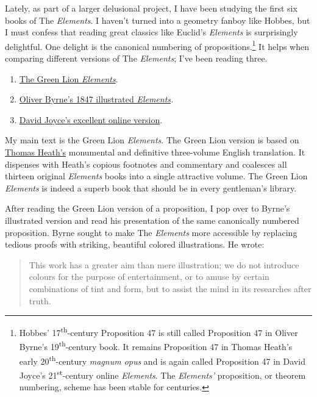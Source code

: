 Lately, as part of a larger delusional project, I have been studying the
first six books of The \emph{Elements}. I haven't turned into a geometry
fanboy like Hobbes, but I must confess that reading great classics like
Euclid's \emph{Elements} is surprisingly delightful. One delight is the
canonical numbering of propositions.\footnote{Hobbes'
  17\textsuperscript{th}-century Proposition 47 is still called
  Proposition 47 in Oliver Byrne's 19\textsuperscript{th}-century book.
  It remains Proposition 47 in Thomas Heath's early
  20\textsuperscript{th}-century \emph{magnum opus} and is again called
  Proposition 47 in David Joyce's 21\textsuperscript{st}-century online
  \emph{Elements}. The \emph{Elements'} proposition, or theorem
  numbering, scheme has been stable for centuries.} It helps when
comparing different versions of The \emph{Elements}; I've been reading
three.

\begin{enumerate}
\def\labelenumi{\arabic{enumi}.}
\tightlist
\item
  \href{https://www.greenlion.com/books/EuclidsElements.html}{The Green
  Lion \emph{Elements}}.
\item
  \href{https://www.c82.net/euclid/}{Oliver Byrne's 1847 illustrated
  \emph{Elements}}\emph{.}
\item
  \href{https://mathcs.clarku.edu/~djoyce/elements/aboutText.html}{David
  Joyce's excellent online version}.
\end{enumerate}

My main text is the Green Lion \emph{Elements}. The Green Lion version
is based on
\href{https://www.perseus.tufts.edu/hopper/text?doc=Euc.+1}{Thomas
Heath's} monumental and definitive three-volume English translation. It
dispenses with Heath's copious footnotes and commentary and coalesces
all thirteen original \emph{Elements} books into a single attractive
volume. The Green Lion \emph{Elements} is indeed a superb book that
should be in every gentleman's library.

After reading the Green Lion version of a proposition, I pop over to
Byrne's illustrated version and read his presentation of the same
canonically numbered proposition. Byrne sought to make The
\emph{Elements} more accessible by replacing tedious proofs with
striking, beautiful colored illustrations. He wrote:

\begin{quote}
This work has a greater aim than mere illustration; we do not introduce
colours for the purpose of entertainment, or to amuse by certain
combinations of tint and form, but to assist the mind in its researches
after truth.
\end{quote}

